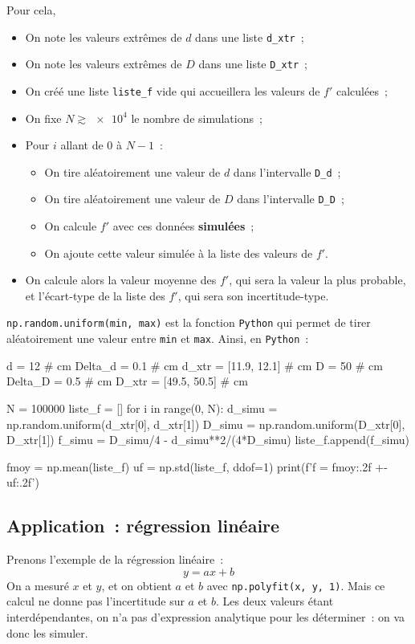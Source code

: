 \documentclass[a4paper, 12pt, garamond]{book}
\begin{document}
Pour cela,
\begin{itemize}[label=$\diamond$, leftmargin=10pt]
	\item On note les valeurs extrêmes de $d$ dans une liste \texttt{d\_xtr}~;
	\item On note les valeurs extrêmes de $D$ dans une liste \texttt{D\_xtr}~;
	\item On créé une liste \texttt{liste\_f} vide qui accueillera les valeurs de
	      $f'$ calculées~;
	\item On fixe $N \gtrsim \num{e4}$ le nombre de simulations~;
	\item Pour $i$ allant de 0 à $N-1$~:
	      \begin{itemize}[label=$\triangleright$, leftmargin=10pt]
		      \item On tire aléatoirement une valeur de $d$ dans l'intervalle
		            \texttt{D\_d}~;
		      \item On tire aléatoirement une valeur de $D$ dans l'intervalle
		            \texttt{D\_D}~;
		      \item On calcule $f'$ avec ces données \textbf{simulées}~;
		      \item On ajoute cette valeur simulée à la liste des valeurs de $f'$.
	      \end{itemize}
	\item On calcule alors la valeur moyenne des $f'$, qui sera la valeur la plus
	      probable, et l'écart-type de la liste des $f'$, qui sera son
	      incertitude-type.
\end{itemize}
\texttt{np.random.uniform(min, max)} est la fonction \texttt{Python} qui permet
de tirer aléatoirement une valeur entre \texttt{min} et \texttt{max}. Ainsi, en
\texttt{Python}~:
\begin{python}
d = 12               # cm
Delta_d = 0.1        # cm
d_xtr = [11.9, 12.1] # cm
D = 50               # cm
Delta_D = 0.5        # cm
D_xtr = [49.5, 50.5] # cm

N = 100000
liste_f = []
for i in range(0, N):
d_simu = np.random.uniform(d_xtr[0], d_xtr[1])
D_simu = np.random.uniform(D_xtr[0], D_xtr[1])
f_simu = D_simu/4 - d_simu**2/(4*D_simu)
liste_f.append(f_simu)

fmoy = np.mean(liste_f)
uf = np.std(liste_f, ddof=1)
print(f'f = {fmoy:.2f} +- {uf:.2f}')
\end{python}

\subsection{Application~: régression linéaire}
Prenons l'exemple de la régression linéaire~:
\[
	y = ax+b
\]
On a mesuré $x$ et $y$, et on obtient $a$ et $b$ avec \texttt{np.polyfit(x, y,
	1)}. Mais ce calcul ne donne pas l'incertitude sur $a$ et $b$. Les deux valeurs
étant interdépendantes, on n'a pas d'expression analytique pour les
déterminer~: on va donc les simuler.
\end{document}
